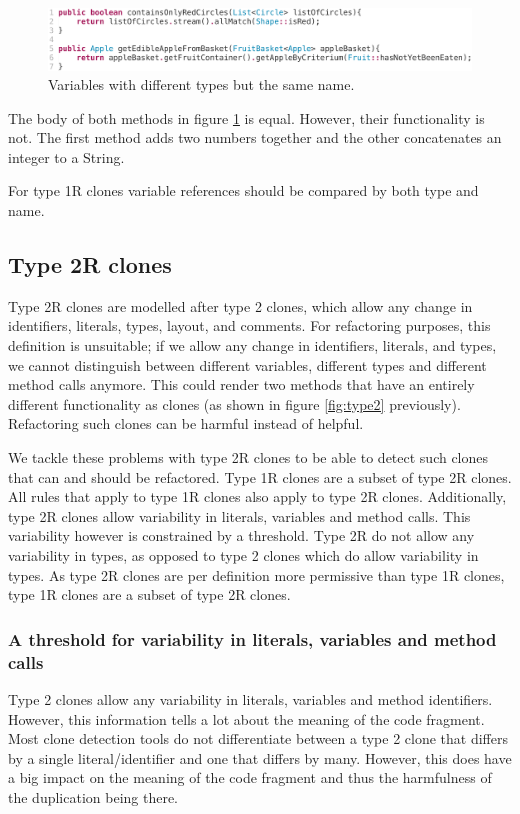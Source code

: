 \begin{figure}[H]
  \includegraphics[width=1\columnwidth]{img/type2}
  \caption{Variables with different types but the same name.}
  \label{fig:type2variables}
\end{figure}

The body of both methods in figure \ref{fig:type2variables} is equal. However, their functionality is not. The first method adds two numbers together and the other concatenates an integer to a String.

For type 1R clones variable references should be compared by both type and name.

\subsection{Type 2R clones}
Type 2R clones are modelled after type 2 clones, which allow any change in identifiers, literals, types, layout, and comments. For refactoring purposes, this definition is unsuitable; if we allow any change in identifiers, literals, and types, we cannot distinguish between different variables, different types and different method calls anymore. This could render two methods that have an entirely different functionality as clones (as shown in figure \ref{fig:type2} previously). Refactoring such clones can be harmful instead of helpful.

We tackle these problems with type 2R clones to be able to detect such clones that can and should be refactored. Type 1R clones are a subset of type 2R clones. All rules that apply to type 1R clones also apply to type 2R clones. Additionally, type 2R clones allow variability in literals, variables and method calls. This variability however is constrained by a threshold. Type 2R do not allow any variability in types, as opposed to type 2 clones which do allow variability in types. As type 2R clones are per definition more permissive than type 1R clones, type 1R clones are a subset of type 2R clones.

\subsubsection{A threshold for variability in literals, variables and method calls}
Type 2 clones allow any variability in literals, variables and method identifiers. However, this information tells a lot about the meaning of the code fragment. Most clone detection tools do not differentiate between a type 2 clone that differs by a single literal/identifier and one that differs by many. However, this does have a big impact on the meaning of the code fragment and thus the harmfulness of the duplication being there.

